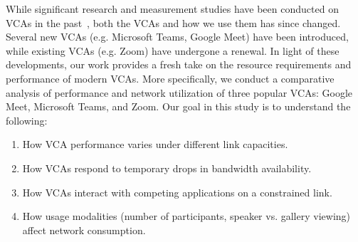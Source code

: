 While significant research and measurement studies have been conducted on VCAs in the past~\cite{guha2005experimental, baset2004analysis, bonfiglio2008detailed, bonfiglio2008tracking, xu2012video}, both the VCAs and how we use them has since changed. Several new VCAs (e.g. Microsoft Teams, Google Meet) have been introduced, while existing VCAs (e.g. Zoom) have undergone a renewal. In light of these developments, our work provides a fresh take on the resource requirements and performance of modern VCAs. More specifically, we conduct a comparative analysis of performance and network utilization of three popular VCAs: Google Meet, Microsoft Teams, and Zoom. %
Our goal in this study is to understand the following:
\begin{enumerate}[noitemsep]
    \item How VCA performance varies under different link capacities.
    \item How VCAs respond to temporary drops in bandwidth availability.
    \item How VCAs interact with competing applications on a constrained link.
    \item How usage modalities (number of participants, speaker vs. gallery viewing) affect network consumption.
\end{enumerate}



